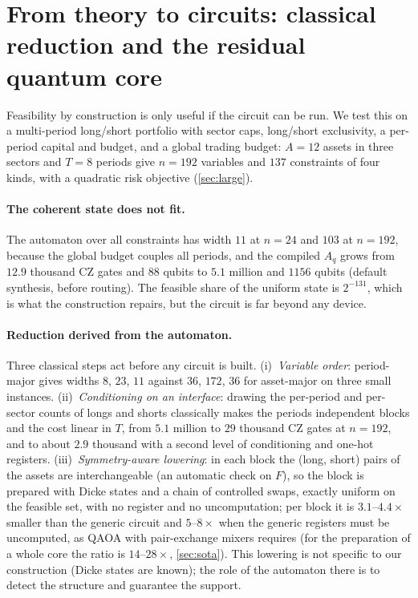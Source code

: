 \section{From theory to circuits: classical reduction and the residual quantum core}\label{sec:reduction}
Feasibility by construction is only useful if the circuit can be run. We test this on a multi-period long/short portfolio with sector caps, long/short exclusivity, a per-period capital and budget, and a global trading budget: $A=12$ assets in three sectors and $T=8$ periods give $n=192$ variables and $137$ constraints of four kinds, with a quadratic risk objective (\cref{sec:large}).

\paragraph{The coherent state does not fit.} The automaton over all constraints has width $11$ at $n=24$ and $103$ at $n=192$, because the global budget couples all periods, and the compiled $A_q$ grows from $12.9$ thousand CZ gates and $88$ qubits to $5.1$ million and $1156$ qubits (default synthesis, before routing). The feasible share of the uniform state is $2^{-131}$, which is what the construction repairs, but the circuit is far beyond any device.

\paragraph{Reduction derived from the automaton.} Three classical steps act before any circuit is built. (i)~\emph{Variable order}: period-major gives widths $8$, $23$, $11$ against $36$, $172$, $36$ for asset-major on three small instances. (ii)~\emph{Conditioning on an interface}: drawing the per-period and per-sector counts of longs and shorts classically makes the periods independent blocks and the cost linear in $T$, from $5.1$ million to $29$ thousand CZ gates at $n=192$, and to about $2.9$ thousand with a second level of conditioning and one-hot registers. (iii)~\emph{Symmetry-aware lowering}: in each block the (long, short) pairs of the assets are interchangeable (an automatic check on $F$), so the block is prepared with Dicke states and a chain of controlled swaps, exactly uniform on the feasible set, with no register and no uncomputation; per block it is $3.1$--$4.4\times$ smaller than the generic circuit and $5$--$8\times$ when the generic registers must be uncomputed, as QAOA with pair-exchange mixers requires (for the preparation of a whole core the ratio is $14$--$28\times$, \cref{sec:sota}). This lowering is not specific to our construction (Dicke states are known); the role of the automaton there is to detect the structure and guarantee the support.

